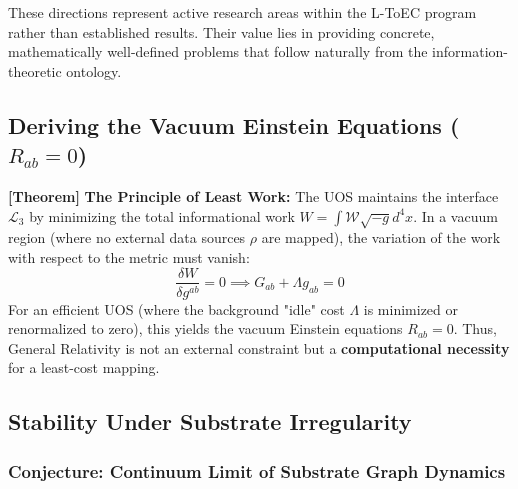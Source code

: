 \documentclass[11pt,titlepage]{article}
\newcommand{\interface}{\mathcal{L}_3}
\newcommand{\tagtheo}{\textcolor{green!60!black}{\textbf{[Theorem]}} }
\begin{document}
These directions represent active research areas within the L-ToEC program rather than established results. Their value lies in providing concrete, mathematically well-defined problems that follow naturally from the information-theoretic ontology.
\subsection{Deriving the Vacuum Einstein Equations (\texorpdfstring{$R_{ab}=0$}{Rab=0})}
\tagtheo \textbf{The Principle of Least Work:} The UOS maintains the interface $\interface$ by minimizing the total informational work $W = \int \mathcal{W} \sqrt{-g} d^4x$. In a vacuum region (where no external data sources $\rho$ are mapped), the variation of the work with respect to the metric must vanish:
\begin{equation}
\frac{\delta W}{\delta g^{ab}} = 0 \implies G_{ab} + \Lambda g_{ab} = 0
\end{equation}
For an efficient UOS (where the background "idle" cost $\Lambda$ is minimized or renormalized to zero), this yields the vacuum Einstein equations $R_{ab} = 0$. Thus, General Relativity is not an external constraint but a \textbf{computational necessity} for a least-cost mapping.

\subsection{Stability Under Substrate Irregularity}

\subsubsection{Conjecture: Continuum Limit of Substrate Graph Dynamics}
\label{conj:graph-continuum}
\end{document}
